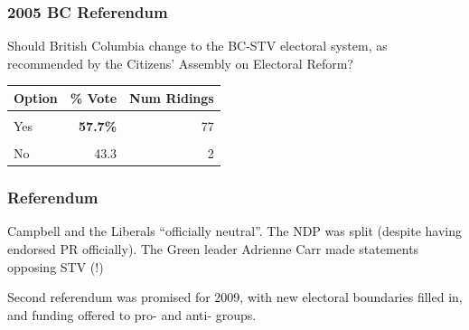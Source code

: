 \documentclass[14pt,t,hyperref={colorlinks=true,urlcolor=red}]{beamer}
\begin{document}
\begin{frame}
\frametitle{2005 BC Referendum}

\begin{block}{}
\begin{center}
Should British Columbia change to the BC-STV electoral system, as
recommended by the Citizens' Assembly on Electoral Reform?
\begin{tabular}[c]{l|r|r}
Option & \% Vote & Num Ridings \\
\hline
 & & \\
Yes &  \textbf{57.7\%} & 77\\
\hline
 & & \\
No &   43.3 & 2 \\
\hline
\end{tabular}
\end{center}
\end{block}


\end{frame}



\begin{frame}
\frametitle{Referendum}

\begin{itemize*}


\item Campbell and the Liberals  ``officially neutral''. The NDP was
split (despite having endorsed PR officially). The Green leader
Adrienne Carr made statements opposing STV (!)

\item Second referendum was promised for 2009, with new electoral
boundaries filled in, and funding offered to pro- and anti- groups.

\end{itemize*}

\end{frame}


\end{document}
